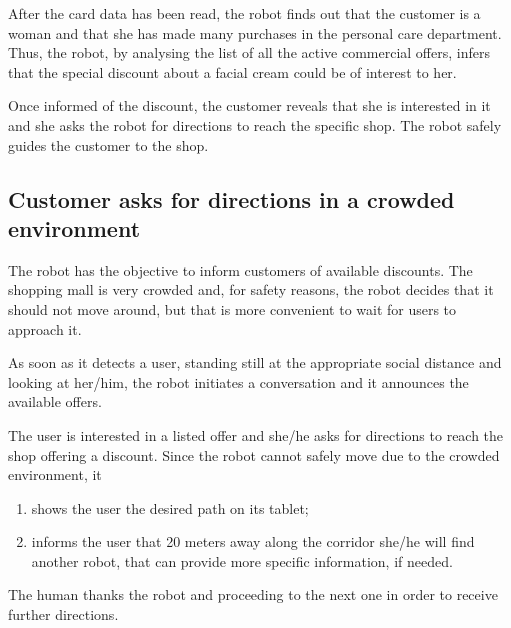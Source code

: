 After the card data has been read, the robot finds out that the customer is a woman and that she
has made many purchases in the personal care department. 
Thus, the robot, by analysing the list of all the active commercial offers,
infers that the special discount about a facial cream could be of interest
to her.

Once informed of the discount, the customer reveals
that she is interested in it and she asks the robot for directions to reach the specific
shop. The robot safely guides the customer to the shop.


\subsection{Customer asks for directions in a crowded environment}

The robot has the objective to inform customers of available discounts.
The shopping mall is very crowded and, for safety
reasons, the robot decides that it should not move around, but
that is more convenient to wait
for users to approach it.

As soon as it detects a user, standing still at
the appropriate social distance and looking at her/him, the robot initiates
a conversation and it announces the available offers.

The user is interested in a listed offer
and she/he asks for directions to reach the shop offering a discount.
Since the robot cannot safely move due to the crowded environment, it
\begin{enumerate}
\item shows the user the desired path on its tablet;
\item informs the user that 20 meters away along the corridor she/he will find another robot,
that can provide more specific information, if needed.
\end{enumerate}

\noindent The human thanks the robot and proceeding to the next one in order to
receive further directions.
